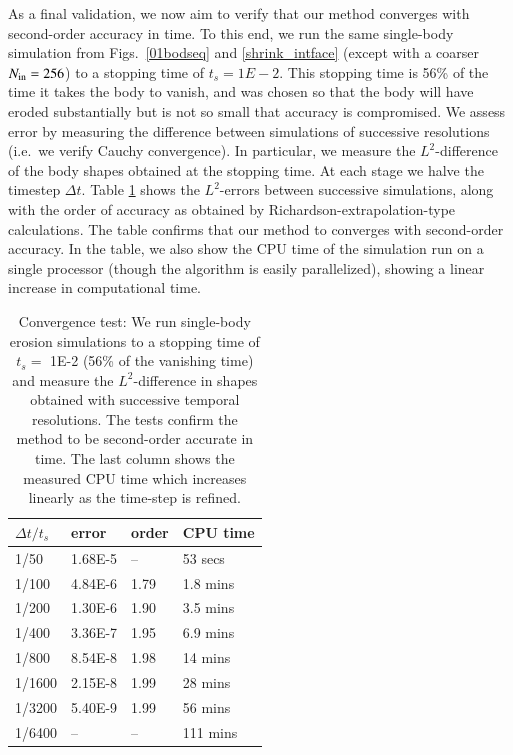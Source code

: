 \documentclass[preprint, 10pt]{elsarticle}
\begin{document}
As a final validation, we now aim to verify that our method converges with second-order accuracy in time. To this end, we run the same single-body simulation from Figs.~\ref{01bodseq} and \ref{shrink_intface} (except with a coarser $N_{\mathrm{in}}=256$) to a stopping time of $t_s = 1E-2$. This stopping time is 56\% of the time it takes the body to vanish, and was chosen so that the body will have eroded substantially but is not so small that accuracy is compromised. We assess error by measuring the difference between simulations of successive resolutions (i.e.~we verify Cauchy convergence). In particular, we measure the $L^2$-difference of the body shapes obtained at the stopping time. At each stage we halve the timestep $\Delta t$. Table \ref{convtab} shows the $L^2$-errors between successive simulations, along with the order of accuracy as obtained by Richardson-extrapolation-type calculations. The table confirms that our method to converges with second-order accuracy. In the table, we also show the CPU time of the simulation run on a single processor (though the algorithm is easily parallelized), showing a linear increase in computational time.

\begin{table}%
\begin{center}
\caption{Convergence test: We run single-body erosion simulations to a stopping time of $t_s =$ 1E-2 (56\% of the vanishing time) and measure the $L^2$-difference in shapes obtained with successive temporal resolutions. The tests confirm the method to be second-order accurate in time. The last column shows the measured CPU time which increases linearly as the time-step is refined.
}
\vspace{0.3 pc}
\label{convtab}
\begin{tabular}{l l l l}
\hline
\hspace{0.0pc} $\Delta t/t_s$
\hspace{0.5pc} & error 
\hspace{0.5pc} & order
\hspace{0.5pc} & CPU time \\
\hline
%
1/50		& 1.68E-5		& --		& 53 secs     	\\
1/100	& 4.84E-6		& 1.79	& 1.8 mins   	\\
1/200	& 1.30E-6		& 1.90	& 3.5 mins  	\\
1/400	& 3.36E-7		& 1.95	& 6.9 mins  	\\
1/800	& 8.54E-8		& 1.98	& 14 mins   	\\
1/1600	& 2.15E-8		& 1.99	& 28 mins  	\\
1/3200	& 5.40E-9		& 1.99	& 56 mins    	\\
1/6400	& --			& --		& 111 mins	\\
%
\hline
\end{tabular}
\end{center}
\end{table}
\end{document}

